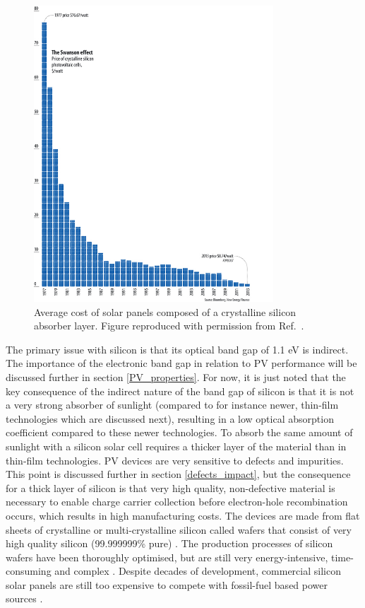 \documentclass[11pt, twoside]{report}
\begin{document}
\begin{figure}[h!]
  \centering
    \includegraphics[width=0.8\textwidth]{figures/Si_cost.jpg}
    \caption[Average cost of solar panels composed of a crystalline silicon absorber layer.]{Average cost of solar panels composed of a crystalline silicon absorber layer. Figure reproduced with permission from Ref.~.}
  \label{Si_cost}
\end{figure}

The primary issue with silicon is that its optical band gap of 1.1 eV is indirect. The importance of the electronic band gap in relation to PV performance will be discussed further in section \ref{PV_properties}. For now, it is just noted that the key consequence of the indirect nature of the band gap of silicon is that it is not a very strong absorber of sunlight (compared to for instance newer, thin-film technologies which are discussed next), resulting in a low optical absorption coefficient  compared to these newer technologies. To absorb the same amount of sunlight with a silicon solar cell requires a thicker layer of the material than in thin-film technologies. PV devices are very sensitive to defects and impurities. This point is discussed further in section \ref{defects_impact}, but the consequence for a thick layer of silicon is that very high quality, non-defective material is necessary to enable charge carrier collection before electron-hole recombination occurs, which results in high manufacturing costs. The devices are made from flat sheets of crystalline or multi-crystalline silicon called wafers that consist of very high quality silicon (99.999999\% pure) 
\cite{sus_book_5}.
The production processes of silicon wafers have been thoroughly optimised, but are still very energy-intensive, time-consuming and complex \cite{emerging_pv}.
Despite decades of development, commercial silicon solar panels are still too expensive to compete with fossil-fuel based power sources \cite{FE_PV_rev1_5}. 
\end{document}
